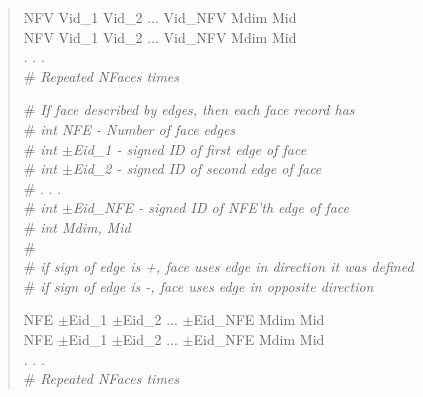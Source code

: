 \documentclass[12pt]{article}
\begin{document}
\begin{verse}
NFV \hspace{0.5ex} Vid\_1 \hspace{0.5ex} Vid\_2 \hspace{0.5ex} ... \hspace{0.5ex} Vid\_NFV \hspace{0.5ex} Mdim \hspace{0.5ex} Mid \\
NFV \hspace{0.5ex} Vid\_1 \hspace{0.5ex} Vid\_2 \hspace{0.5ex} ... \hspace{0.5ex} Vid\_NFV \hspace{0.5ex} Mdim \hspace{0.5ex} Mid \\
. . . \\
\# \textit{Repeated NFaces times}
\vspace{2ex}\vspace{1ex}

\# \textit{If face described by edges, then each face record has} \\
\# \textit{\textit{int} NFE - Number of face edges} \\
\# \textit{\textit{int} $\pm$Eid\_1 - signed ID of first edge of face} \\
\# \textit{\textit{int} $\pm$Eid\_2 - signed ID of second edge of face} \\
\# . . . \\
\# \textit{\textit{int} $\pm$Eid\_NFE - signed ID of NFE'th edge of face} \\
\# \textit{\textit{int} Mdim, Mid} \\
\# \\
\# \textit{if sign of edge is +, face uses edge in direction it was defined} \\
\# \textit{if sign of edge is -, face uses edge in opposite direction} \\
\vspace{1ex}

NFE \hspace{0.5ex} $\pm$Eid\_1 \hspace{0.5ex} $\pm$Eid\_2 \hspace{0.5ex} ... \hspace{0.5ex} $\pm$Eid\_NFE \hspace{0.5ex} Mdim Mid \\
NFE \hspace{0.5ex} $\pm$Eid\_1 \hspace{0.5ex} $\pm$Eid\_2 \hspace{0.5ex} ... \hspace{0.5ex} $\pm$Eid\_NFE \hspace{0.5ex} Mdim Mid \\
. . . \\
\# \textit{Repeated NFaces times}
\vspace{2ex}\vspace{1ex}



\end{verse}
\end{document}
